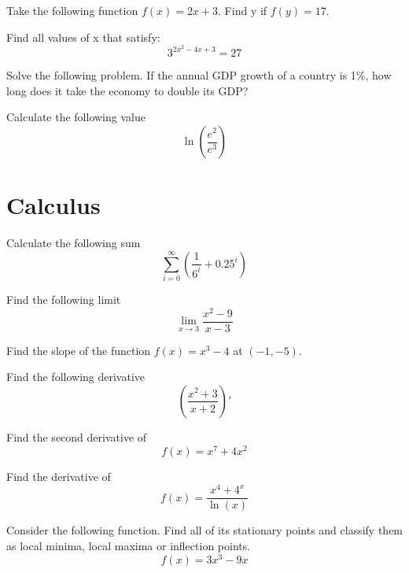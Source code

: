 \documentclass[10pt]{article}
\newenvironment{problem}[2][Problem]{\begin{trivlist}
\item[\hskip \labelsep {\bfseries #1}\hskip \labelsep {\bfseries #2.}]}{\end{trivlist}}
\begin{document}
\begin{problem}{2.2}
Take the following function $f(x)=2x+3$. Find y if $f(y)=17$.
\end{problem}

\begin{problem}{2.3}
Find all values of x that satisfy:
$$3^{2x^2-4x+3}=27$$
\end{problem}

\begin{problem}{2.4}
Solve the following problem. If the annual GDP growth of a country is 1\%, how long does it take the economy to double its GDP?
\end{problem}

\begin{problem}{2.5}
Calculate the following value
$$\ln\left(\frac{e^2}{e^3} \right)$$
\end{problem}

\section{Calculus}

\begin{problem}{3.1}
Calculate the following sum
$$\sum\limits_{i=0}^{\infty} \left( \frac{1}{6^i}+0.25^i\right)$$
\end{problem}

\begin{problem}{3.2}
Find the following limit
$$\lim\limits_{x \rightarrow 3}\frac{x^2-9}{x-3}$$
\end{problem}

\begin{problem}{3.3}
Find the slope of the function $f(x)=x^3-4$ at $(-1,-5)$.
\end{problem}

\begin{problem}{3.4}
Find the following derivative
$$\left( \frac{x^2+3}{x+2}\right)'$$
\end{problem}

\begin{problem}{3.5}
Find the second derivative of
 $$f(x)= x^7+4x^2$$
\end{problem}

\begin{problem}{3.6}
Find the derivative of
$$f(x)=\frac{x^4+4^x}{\ln(x)}$$
\end{problem}

\begin{problem}{3.7}
Consider the following function. Find all of its stationary points and classify them as local minima, local maxima or inflection points.
$$f(x)=3x^3-9x$$
\end{problem}
\end{document}

